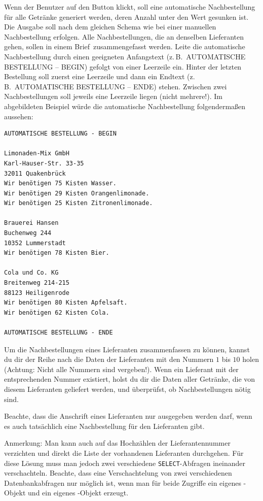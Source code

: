 \begin{compactenum}[a)]
Wenn der Benutzer auf den Button 
klickt, soll eine automatische Nachbestellung für alle Getränke generiert
werden, deren Anzahl unter den Wert  gesunken ist. Die
Ausgabe soll nach dem gleichen Schema wie bei einer manuellen Nachbestellung
erfolgen. Alle Nachbestellungen, die an denselben Lieferanten gehen, sollen in
einem \glqq Brief\grqq\ zusammengefasst werden. Leite die automatische Nachbestellung
durch einen geeigneten Anfangstext (z.\,B.\ \glqq AUTOMATISCHE BESTELLUNG -- BEGIN\grqq )
gefolgt von einer Leerzeile ein. Hinter der letzten Bestellung soll zuerst eine
Leerzeile und dann ein Endtext (z.\,B.\ \glqq AUTOMATISCHE BESTELLUNG -- ENDE\grqq ) stehen.
Zwischen zwei Nachbestellungen soll jeweils eine Leerzeile liegen (nicht
mehrere!). Im abgebildeten Beispiel würde die automatische Nachbestellung
folgendermaßen aussehen:

\smallskip

\begin{verbatim}
AUTOMATISCHE BESTELLUNG - BEGIN

Limonaden-Mix GmbH
Karl-Hauser-Str. 33-35
32011 Quakenbrück
Wir benötigen 75 Kisten Wasser.
Wir benötigen 29 Kisten Orangenlimonade.
Wir benötigen 25 Kisten Zitronenlimonade.

Brauerei Hansen
Buchenweg 244
10352 Lummerstadt
Wir benötigen 78 Kisten Bier.

Cola und Co. KG
Breitenweg 214-215
88123 Heiligenrode
Wir benötigen 80 Kisten Apfelsaft.
Wir benötigen 62 Kisten Cola.

AUTOMATISCHE BESTELLUNG - ENDE
\end{verbatim}

\smallskip

Um die Nachbestellungen eines Lieferanten zusammenfassen zu können, kannst du
dir der Reihe nach die Daten der Lieferanten mit den Nummern $1$ bis $10$ holen
(Achtung: Nicht alle Nummern sind vergeben!). Wenn ein Lieferant mit der
entsprechenden Nummer existiert, holst du dir die Daten aller Getränke, die von
diesem Lieferanten geliefert werden, und überprüfst, ob Nachbestellungen nötig
sind.

Beachte, dass die Anschrift eines Lieferanten nur ausgegeben werden darf, wenn
es auch tatsächlich eine Nachbestellung für den Lieferanten gibt.

Anmerkung: Man kann auch auf das Hochzählen der Lieferantennummer verzichten
und direkt die Liste der vorhandenen Lieferanten durchgehen. Für diese Lösung
muss man jedoch zwei verschiedene \lstinline|SELECT|-Abfragen ineinander
verschachteln. Beachte, dass eine Verschachtelung von zwei verschiedenen
Datenbankabfragen nur möglich ist, wenn man für beide Zugriffe ein eigenes
-Objekt und ein eigenes -Objekt erzeugt.
\end{compactenum}

